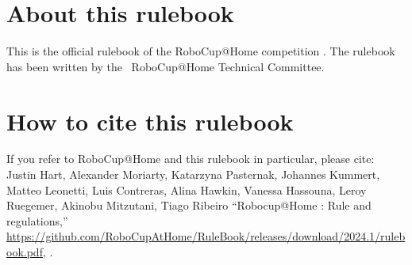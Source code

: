 
\section*{About this rulebook}
This is the official rulebook of the RoboCup@Home competition \YEAR. 
The rulebook has been written by the \YEAR ~RoboCup@Home Technical Committee.

\section*{How to cite this rulebook}
If you refer to RoboCup@Home and this rulebook in particular, please cite:\\

\noindent Justin Hart, Alexander Moriarty, Katarzyna Pasternak, Johannes Kummert, Matteo Leonetti, Luis Contreras,
Alina Hawkin, Vanessa Hassouna, Leroy Ruegemer, Akinobu Mitzutani, Tiago Ribeiro
\enquote{Robocup@Home \YEAR: Rule and regulations,}
\url{https://github.com/RoboCupAtHome/RuleBook/releases/download/2024.1/rulebook.pdf}, \YEAR.

\begin{center}
	\begin{minipage}{0.8\textwidth}
		\footnotesize%
		
	\end{minipage}
\end{center}

\pagebreak